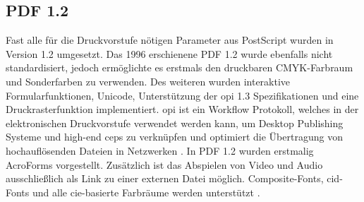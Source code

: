 \subsection{PDF 1.2}
Fast alle für die Druckvorstufe nötigen Parameter aus PostScript wurden in Version 1.2 umgesetzt. Das 1996 erschienene PDF 1.2 wurde ebenfalls nicht standardisiert, jedoch ermöglichte es erstmals den druckbaren CMYK-Farbraum und Sonderfarben zu verwenden. Des weiteren wurden interaktive Formularfunktionen, Unicode, Unterstützung der \gls{opi} 1.3 Spezifikationen und eine Druckrasterfunktion implementiert\cite{proj-consult}. \gls{opi} ist ein Workflow Protokoll, welches in der elektronischen Druckvorstufe verwendet werden kann, um Desktop Publishing Systeme und high-end \gls{ceps} zu verknüpfen und optimiert die Übertragung von hochauflösenden Dateien in Netzwerken \cite{printwiki}. In PDF 1.2 wurden erstmalig AcroForms vorgestellt. Zusätzlich ist das Abspielen von Video und Audio ausschließlich als Link zu einer externen Datei möglich. Composite-Fonts, \gls{cid}-Fonts und alle \gls{cie}-basierte Farbräume werden unterstützt \cite{schneeberger}.


